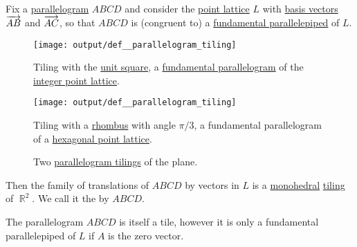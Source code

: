 \begin{definition}\label{def:parallelogram_tiling}
  Fix a \hyperref[def:parallelogram]{parallelogram} \( ABCD \) and consider the \hyperref[def:point_lattice]{point lattice} \( L \) with \hyperref[def:point_lattice_basis]{basis vectors} \( \overrightarrow{AB} \) and \( \overrightarrow{AC} \), so that \( ABCD \) is (congruent to) a \hyperref[def:fundamental_parallelotope]{fundamental parallelepiped} of \( L \).

  \begin{figure}[!ht]
    \begin{subcaptionblock}{0.45\linewidth}
      \centering
      \texttt{[image: output/def\_\_parallelogram\_tiling]}
      \caption{Tiling with the \hyperref[def:unit_hypercube]{unit square}, a \hyperref[def:fundamental_parallelotope]{fundamental parallelogram} of the \hyperref[def:integer_point_lattice]{integer point lattice}.}\label{fig:def:parallelogram_tiling/square}
    \end{subcaptionblock}
    \hfill
    \begin{subcaptionblock}{0.45\linewidth}
      \centering
      \texttt{[image: output/def\_\_parallelogram\_tiling]}
      \caption{Tiling with a \hyperref[def:parallelogram/rhombus]{rhombus} with angle \( \pi / 3 \), a fundamental parallelogram of a \hyperref[def:hexagonal_point_lattice]{hexagonal point lattice}.}\label{fig:def:parallelogram_tiling/rhombus}
    \end{subcaptionblock}
    \caption{Two \hyperref[def:parallelogram_tiling]{parallelogram tilings} of the plane.}\label{fig:def:parallelogram_tiling}
  \end{figure}

  Then the family of translations of \( ABCD \) by vectors in \( L \) is a \hyperref[def:k_hedral_tiling]{monohedral} \hyperref[def:topological_space_tiling]{tiling} of \( \BbbR^2 \). We call it the  by \( ABCD \).
\end{definition}
\begin{comments}
  \item The parallelogram \( ABCD \) is itself a tile, however it is only a fundamental parallelepiped of \( L \) if \( A \) is the zero vector.
\end{comments}
